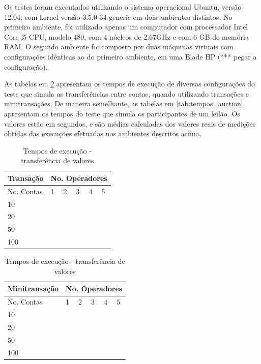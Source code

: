 \documentclass[11pt,twoside,a4paper]{book}
\begin{document}
Os testes foram executados utilizando o sistema operacional Ubuntu, versão 12.04, com kernel versão 3.5.0-34-generic em dois ambientes distintos. No primeiro ambiente, foi utilizado apenas um computador com processador Intel\textregistered{} Core\texttrademark{} i5 CPU, modelo 480, com 4 núcleos de 2.67GHz e com 6 GB de memória RAM. O segundo ambiente foi composto por duas máquinas virtuais com configurações idênticas ao do primeiro ambiente, em uma Blade HP (*** pegar a configuração).

As tabelas em \ref{tab:tempos_account} apresentam os tempos de execução de diversas configurações do teste que simula as transferências entre contas, quando utilizando transações e minitransações. De maneira semelhante, as tabelas em  \ref{tab:tempos_auction} apresentam os tempos do teste que simula os participantes de um leilão. Os valores estão em segundos, e são médias calculadas dos valores reais de medições obtidas das execuções efetuadas nos ambientes descritos acima.

\begin{table}[h]
	\centering
    	\begin{tabular}{|l|l|l|l|l|l|}
		\hline
		\textbf{Transação} & \multicolumn{5}{l}{No. Operadores} \\
		\hline
		No. Contas & 1 & 2 & 3 & 4 & 5 \\
		\hline
		10 &  &  &  &  &  \\
		\hline
		20 &  &  &  &  &  \\
		\hline
		50 &  &  &  &  &  \\
		\hline
		100 &  &  &  &  &  \\
		\hline
	\end{tabular}
	\begin{tabular}{|l|l|l|l|l|l|}
		\hline
		\textbf{Minitransação} & \multicolumn{5}{l}{No. Operadores} \\
		\hline
		No. Contas & 1 & 2 & 3 & 4 & 5 \\
		\hline
		10 &  &  &  &  &  \\
		\hline
		20 &  &  &  &  &  \\
		\hline
		50 &  &  &  &  &  \\
		\hline
		100 &  &  &  &  &  \\
		\hline
	\end{tabular}
	\caption{Tempos de execução - transferência de valores}
	\label{tab:tempos_account}
\end{table}
\end{document}

